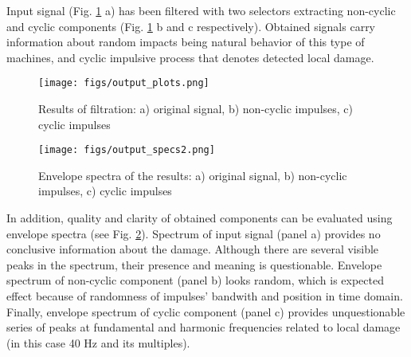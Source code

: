 \documentclass[conference,a4paper]{IEEEtran}
\begin{document}
Input signal (Fig. \ref{fig: outplots} a) has been filtered with two selectors extracting non-cyclic and cyclic components (Fig. \ref{fig: outplots} b and c respectively). Obtained signals carry information about random impacts being natural behavior of this type of machines, and cyclic impulsive process that denotes detected local damage.

\begin{figure}[!ht]
\centering
\texttt{[image: figs/output\_plots.png]}
\caption{Results of filtration: a) original signal, b) non-cyclic impulses, c) cyclic impulses}
\label{fig: outplots}
\end{figure}

\begin{figure}[!ht]
\centering
\texttt{[image: figs/output\_specs2.png]}
\caption{Envelope spectra of the results: a) original signal, b) non-cyclic impulses, c) cyclic impulses}
\label{fig: outspecs}
\end{figure}

In addition, quality and clarity of obtained components can be evaluated using envelope spectra (see Fig. \ref{fig: outspecs}). Spectrum of input signal (panel a) provides no conclusive information about the damage. Although there are several visible peaks in the spectrum, their presence and meaning is questionable. Envelope spectrum of non-cyclic component (panel b) looks random, which is expected effect because of randomness of impulses' bandwith and position in time domain. Finally, envelope spectrum of cyclic component (panel c) provides unquestionable series of peaks at fundamental and harmonic frequencies related to local damage (in this case 40 Hz and its multiples). 
%
%
\end{document}
